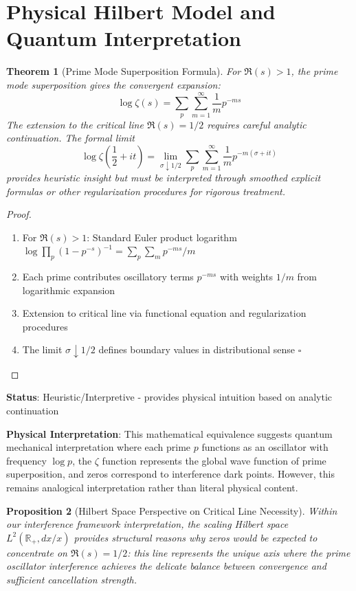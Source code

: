 \documentclass[12pt]{article}
\theoremstyle{plain}
\newtheorem{theorem}{Theorem}[section]
\newtheorem{proposition}[theorem]{Proposition}
\theoremstyle{definition}
\begin{document}
\section{Physical Hilbert Model and Quantum Interpretation}

\begin{theorem}[Prime Mode Superposition Formula]
For $\Re(s) > 1$, the prime mode superposition gives the convergent expansion:
$$\log \zeta(s) = \sum_{p}\sum_{m=1}^{\infty} \frac{1}{m} p^{-ms}$$
The extension to the critical line $\Re(s) = 1/2$ requires careful analytic continuation. The formal limit
$$\log \zeta\left(\frac{1}{2}+it\right) = \lim_{\sigma \downarrow 1/2} \sum_{p}\sum_{m=1}^{\infty} \frac{1}{m} p^{-m(\sigma+it)}$$
provides heuristic insight but must be interpreted through smoothed explicit formulas or other regularization procedures for rigorous treatment.
\end{theorem}

\begin{proof}
\begin{enumerate}
\item For $\Re(s) > 1$: Standard Euler product logarithm $\log \prod_p (1-p^{-s})^{-1} = \sum_p \sum_m p^{-ms}/m$
\item Each prime contributes oscillatory terms $p^{-ms}$ with weights $1/m$ from logarithmic expansion
\item Extension to critical line via functional equation and regularization procedures
\item The limit $\sigma \downarrow 1/2$ defines boundary values in distributional sense $\square$
\end{enumerate}
\end{proof}

\textbf{Status}: Heuristic/Interpretive - provides physical intuition based on analytic continuation

\textbf{Physical Interpretation}: This mathematical equivalence suggests quantum mechanical interpretation where each prime $p$ functions as an oscillator with frequency $\log p$, the $\zeta$ function represents the global wave function of prime superposition, and zeros correspond to interference dark points. However, this remains analogical interpretation rather than literal physical content.

\begin{proposition}[Hilbert Space Perspective on Critical Line Necessity]
Within our interference framework interpretation, the scaling Hilbert space $L^2(\mathbb{R}_+, dx/x)$ provides structural reasons why zeros would be expected to concentrate on $\Re(s) = 1/2$: this line represents the unique axis where the prime oscillator interference achieves the delicate balance between convergence and sufficient cancellation strength.
\end{proposition}
\end{document}
